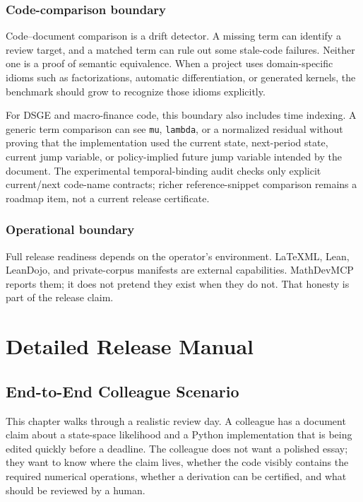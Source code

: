 \documentclass[12pt,a4paper,openany]{book}
\begin{document}
\section{Code-comparison boundary}

Code--document comparison is a drift detector. A missing term can identify a
review target, and a matched term can rule out some stale-code failures. Neither
one is a proof of semantic equivalence. When a project uses domain-specific
idioms such as factorizations, automatic differentiation, or generated kernels,
the benchmark should grow to recognize those idioms explicitly.

For DSGE and macro-finance code, this boundary also includes time indexing. A
generic term comparison can see \texttt{mu}, \texttt{lambda}, or a normalized
residual without proving that the implementation used the current state,
next-period state, current jump variable, or policy-implied future jump variable
intended by the document. The experimental temporal-binding audit checks only
explicit current/next code-name contracts; richer reference-snippet comparison
remains a roadmap item, not a current release certificate.

\section{Operational boundary}

Full release readiness depends on the operator's environment. LaTeXML, Lean,
LeanDojo, and private-corpus manifests are external capabilities. MathDevMCP
reports them; it does not pretend they exist when they do not. That honesty is
part of the release claim.

\part{Detailed Release Manual}

\chapter{End-to-End Colleague Scenario}

This chapter walks through a realistic review day. A colleague has a document
claim about a state-space likelihood and a Python implementation that is being
edited quickly before a deadline. The colleague does not want a polished essay;
they want to know where the claim lives, whether the code visibly contains the
required numerical operations, whether a derivation can be certified, and what
should be reviewed by a human.
\end{document}
